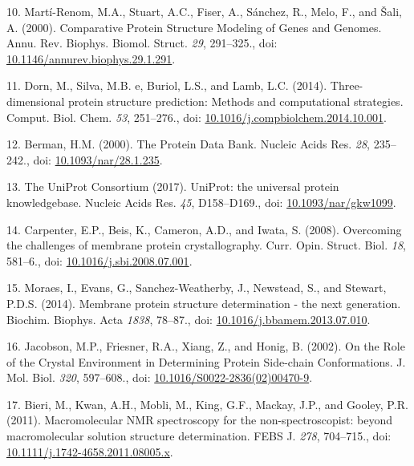 \documentclass[11pt,a4paper,twoside]{book}
\theoremstyle{definition}
\theoremstyle{definition}
\theoremstyle{remark}
\begin{document}
\hypertarget{ref-Marti-Renom2000}{}
10. Martí-Renom, M.A., Stuart, A.C., Fiser, A., Sánchez, R., Melo, F.,
and Šali, A. (2000). Comparative Protein Structure Modeling of Genes and
Genomes. Annu. Rev. Biophys. Biomol. Struct. \emph{29}, 291--325., doi:
\href{https://doi.org/10.1146/annurev.biophys.29.1.291}{10.1146/annurev.biophys.29.1.291}.

\hypertarget{ref-Dorn2014}{}
11. Dorn, M., Silva, M.B. e, Buriol, L.S., and Lamb, L.C. (2014).
Three-dimensional protein structure prediction: Methods and
computational strategies. Comput. Biol. Chem. \emph{53}, 251--276., doi:
\href{https://doi.org/10.1016/j.compbiolchem.2014.10.001}{10.1016/j.compbiolchem.2014.10.001}.

\hypertarget{ref-Berman2000}{}
12. Berman, H.M. (2000). The Protein Data Bank. Nucleic Acids Res.
\emph{28}, 235--242., doi:
\href{https://doi.org/10.1093/nar/28.1.235}{10.1093/nar/28.1.235}.

\hypertarget{ref-TheUniProtConsortium2017}{}
13. The UniProt Consortium (2017). UniProt: the universal protein
knowledgebase. Nucleic Acids Res. \emph{45}, D158--D169., doi:
\href{https://doi.org/10.1093/nar/gkw1099}{10.1093/nar/gkw1099}.

\hypertarget{ref-Carpenter2008}{}
14. Carpenter, E.P., Beis, K., Cameron, A.D., and Iwata, S. (2008).
Overcoming the challenges of membrane protein crystallography. Curr.
Opin. Struct. Biol. \emph{18}, 581--6., doi:
\href{https://doi.org/10.1016/j.sbi.2008.07.001}{10.1016/j.sbi.2008.07.001}.

\hypertarget{ref-Moraes2014}{}
15. Moraes, I., Evans, G., Sanchez-Weatherby, J., Newstead, S., and
Stewart, P.D.S. (2014). Membrane protein structure determination - the
next generation. Biochim. Biophys. Acta \emph{1838}, 78--87., doi:
\href{https://doi.org/10.1016/j.bbamem.2013.07.010}{10.1016/j.bbamem.2013.07.010}.

\hypertarget{ref-Jacobson2002}{}
16. Jacobson, M.P., Friesner, R.A., Xiang, Z., and Honig, B. (2002). On
the Role of the Crystal Environment in Determining Protein Side-chain
Conformations. J. Mol. Biol. \emph{320}, 597--608., doi:
\href{https://doi.org/10.1016/S0022-2836(02)00470-9}{10.1016/S0022-2836(02)00470-9}.

\hypertarget{ref-Bieri2011}{}
17. Bieri, M., Kwan, A.H., Mobli, M., King, G.F., Mackay, J.P., and
Gooley, P.R. (2011). Macromolecular NMR spectroscopy for the
non-spectroscopist: beyond macromolecular solution structure
determination. FEBS J. \emph{278}, 704--715., doi:
\href{https://doi.org/10.1111/j.1742-4658.2011.08005.x}{10.1111/j.1742-4658.2011.08005.x}.
\end{document}
